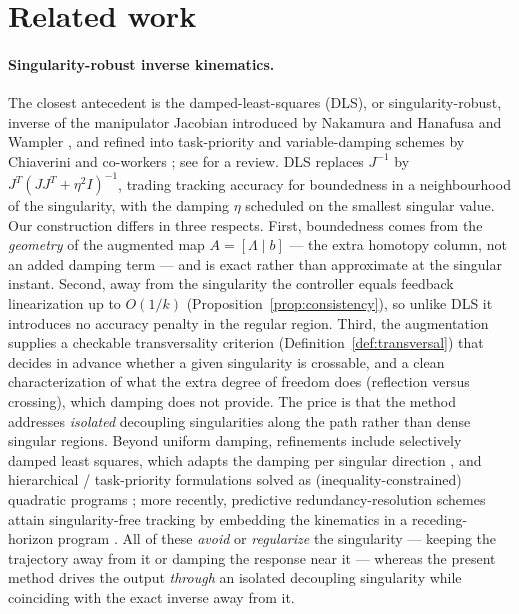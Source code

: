 \documentclass[11pt,american]{article}
\theoremstyle{definition}
\theoremstyle{plain}
\theoremstyle{remark}
\begin{document}
\section{Related work}\label{sec:related}

\paragraph{Singularity-robust inverse kinematics.} The closest antecedent is the damped-least-squares (DLS), or singularity-robust, inverse of the manipulator Jacobian introduced by Nakamura and Hanafusa \cite{Nakamura1986} and Wampler \cite{Wampler1986}, and refined into task-priority and variable-damping schemes by Chiaverini and co-workers \cite{Chiaverini1997,ChiaveriniHandbook2008}; see \cite{Deo1995} for a review. DLS replaces $J^{-1}$ by $J^T(JJ^T + \eta^2 I)^{-1}$, trading tracking accuracy for boundedness in a neighbourhood of the singularity, with the damping $\eta$ scheduled on the smallest singular value. Our construction differs in three respects. First, boundedness comes from the \emph{geometry} of the augmented map $A = [\Lambda \mid b]$ --- the extra homotopy column, not an added damping term --- and is exact rather than approximate at the singular instant. Second, away from the singularity the controller equals feedback linearization up to $O(1/k)$ (Proposition~\ref{prop:consistency}), so unlike DLS it introduces no accuracy penalty in the regular region. Third, the augmentation supplies a checkable transversality criterion (Definition~\ref{def:transversal}) that decides in advance whether a given singularity is crossable, and a clean characterization of what the extra degree of freedom does (reflection versus crossing), which damping does not provide. The price is that the method addresses \emph{isolated} decoupling singularities along the path rather than dense singular regions. Beyond uniform damping, refinements include selectively damped least squares, which adapts the damping per singular direction \cite{BussKim2005}, and hierarchical / task-priority formulations solved as (inequality-constrained) quadratic programs \cite{Escande2014,Moe2016}; more recently, predictive redundancy-resolution schemes attain singularity-free tracking by embedding the kinematics in a receding-horizon program \cite{HIMPC2024}. All of these \emph{avoid} or \emph{regularize} the singularity --- keeping the trajectory away from it or damping the response near it --- whereas the present method drives the output \emph{through} an isolated decoupling singularity while coinciding with the exact inverse away from it.
\end{document}
